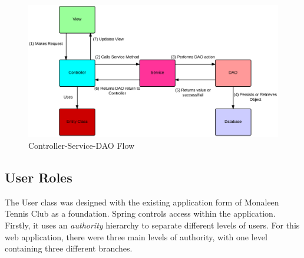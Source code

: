 \begin{figure}[H]
\begin{center}
\includegraphics[width=14cm]{csdao.png}
\end{center}
\caption{Controller-Service-DAO Flow}
\label{fig:csdao}
\end{figure}

\subsection{User Roles}

The User class was designed with the existing application form of Monaleen Tennis Club as a foundation. 
Spring controls access within the application. Firstly, it uses an \textit{authority} hierarchy to separate different levels of users. For this web application, there were three main levels of authority, with one level containing three different branches.

